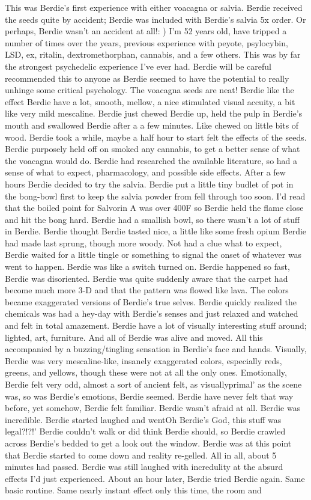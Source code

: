 \documentclass[12pt]{book}
\begin{document}
This was Berdie's first experience with either voacagna or salvia. Berdie received the seeds quite by accident; Berdie was included with Berdie's salvia 5x order. Or perhaps, Berdie wasn't an accident at all!: ) I'm 52 years old, have tripped a number of times over the years, previous experience with peyote, psylocybin, LSD, ex, ritalin, dextromethorphan, cannabis, and a few others. This was by far the strongest psychedelic experience I've ever had. Berdie will be careful recommended this to anyone as Berdie seemed to have the potential to really unhinge some critical psychology. The voacagna seeds are neat! Berdie like the effect Berdie have a lot, smooth, mellow, a nice stimulated visual accuity, a bit like very mild mescaline. Berdie just chewed Berdie up, held the pulp in Berdie's mouth and swallowed Berdie after a a few minutes. Like chewed on little bits of wood. Berdie took a while, maybe a half hour to start felt the effects of the seeds. Berdie purposely held off on smoked any cannabis, to get a better sense of what the voacagna would do. Berdie had researched the available literature, so had a sense of what to expect, pharmacology, and possible side effects. After a few hours Berdie decided to try the salvia. Berdie put a little tiny budlet of pot in the bong-bowl first to keep the salvia powder from fell through too soon. I'd read that the boiled point for Salvorin A was over 400F so Berdie held the flame close and hit the bong hard. Berdie had a smallish bowl, so there wasn't a lot of stuff in Berdie. Berdie thought Berdie tasted nice, a little like some fresh opium Berdie had made last sprung, though more woody. Not had a clue what to expect, Berdie waited for a little tingle or something to signal the onset of whatever was went to happen. Berdie was like a switch turned on. Berdie happened so fast, Berdie was disoriented. Berdie was quite suddenly aware that the carpet had become much more 3-D and that the pattern was flowed like lava. The colors became exaggerated versions of Berdie's true selves. Berdie quickly realized the chemicals was had a hey-day with Berdie's senses and just relaxed and watched and felt in total amazement. Berdie have a lot of visually interesting stuff around; lighted, art, furniture. And all of Berdie was alive and moved. All this accompanied by a buzzing/tingling sensation in Berdie's face and hands. Visually, Berdie was very mescaline-like, insanely exaggerated colors, especially reds, greens, and yellows, though these were not at all the only ones. Emotionally, Berdie felt very odd, almost a sort of ancient felt, as visuallyprimal' as the scene was, so was Berdie's emotions, Berdie seemed. Berdie have never felt that way before, yet somehow, Berdie felt familiar. Berdie wasn't afraid at all. Berdie was incredible. Berdie started laughed and wentOh Berdie's God, this stuff was legal?!?!' Berdie couldn't walk or did think Berdie should, so Berdie crawled across Berdie's bedded to get a look out the window. Berdie was at this point that Berdie started to come down and reality re-gelled. All in all, about 5 minutes had passed. Berdie was still laughed with incredulity at the absurd effects I'd just experienced. About an hour later, Berdie tried Berdie again. Same basic routine. Same nearly instant effect only this time, the room and 
\end{document}
